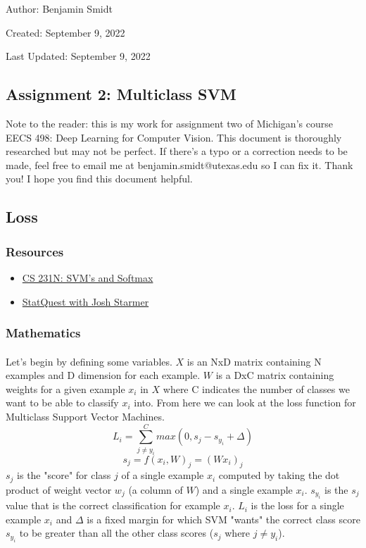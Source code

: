 \documentclass[12pt]{article}
\begin{document}
\noindent Author: Benjamin Smidt

\noindent Created: September 9, 2022

\noindent Last Updated: September 9, 2022
\begin{center}
\section*{Assignment 2: Multiclass SVM}
\end{center}

\noindent Note to the reader: this is my work for assignment two of Michigan's course
EECS 498: Deep Learning for Computer Vision. This document is thoroughly researched but
may not be perfect. If there's a typo or a correction needs to be made, feel free to 
email me at benjamin.smidt@utexas.edu so I can fix it. Thank you! I hope you find this 
document helpful.

\subsection*{Loss}

\subsubsection{Resources}
\begin{itemize}
    \item \href{https://cs231n.github.io/linear-classify/#svm-vs-softmax}{CS 231N: SVM's and Softmax }
    \item \href{https://www.youtube.com/watch?v=efR1C6CvhmE}{StatQuest with Josh Starmer}
\end{itemize}

\subsubsection{Mathematics}

\paragraph{}
Let's begin by defining some variables. $X$ is an NxD matrix containing 
N examples and D dimension for each example. $W$ is a DxC matrix containing 
weights for a given example $x_i$ in $X$ where C indicates the number of 
classes we want to be able to classify $x_i$ into. From here we can look
at the loss function for Multiclass Support Vector Machines.
\begin{equation}
    L_{i} = \sum_{j \neq y_{i}}^C max(0, s_{j} - s_{y_{i}} + \Delta)
\end{equation}
\begin{equation}
    s_{j} = f(x_{i}, W)_{j} = (Wx_i)_j
\end{equation}
$s_j$ is the "score" for class $j$ of a single example $x_i$
computed by taking the dot product of weight vector $w_j$ 
(a column of $W$) and a single example $x_i$. $s_{y_{i}}$ is the $s_j$ value
that is the correct classification for example $x_i$. 
$L_i$ is the loss for a single example $x_i$ and $\Delta$ 
is a fixed margin for which SVM "wants" the correct class score 
$s_{y_i}$ to be greater than all the other class scores ($s_j$ where $j \neq y_i$). 
\end{document}

